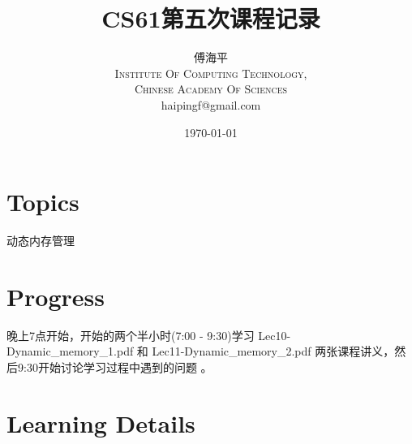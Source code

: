 \documentclass[a4paper, 11pt]{article}
\title{CS61第五次课程记录}
\author{傅海平\\
\textsc{Institute Of Computing Technology,}\\
\textsc{Chinese Academy Of Sciences}\\
haipingf@gmail.com\\
}
\date{\today}
\begin{document}
\maketitle
\newpage
\tableofcontents
\newpage
\section{Topics}
\begin{center}
\LARGE{动态内存管理}
\end{center}

\section{Progress}
晚上7点开始，开始的两个半小时(7:00 - 9:30)学习 Lec10-Dynamic\_memory\_1.pdf 和
Lec11-Dynamic\_memory\_2.pdf 两张课程讲义，然后9:30开始讨论学习过程中遇到的问题
。
\section{Learning Details}
\end{document}
